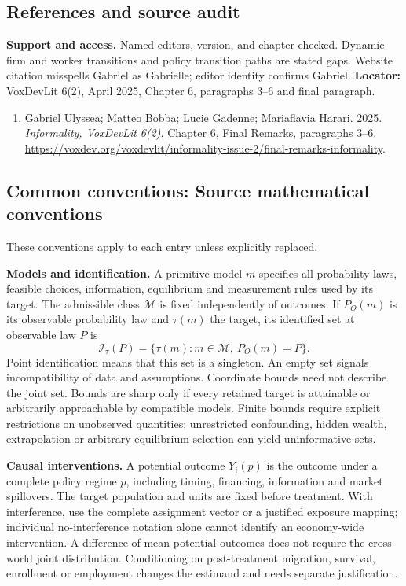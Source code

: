 \documentclass[11pt,a4paper]{article}
\begin{document}
\subsection*{References and source audit}
\textbf{Support and access.} Named editors, version, and chapter checked. Dynamic firm and worker transitions and policy transition paths are stated gaps. Website citation misspells Gabriel as Gabrielle; editor identity confirms Gabriel. \textbf{Locator:} VoxDevLit 6(2), April 2025, Chapter 6, paragraphs 3--6 and final paragraph.
\begin{enumerate}\raggedright
\item\hypertarget{definitions:source:30007658:1}{} Gabriel Ulyssea; Matteo Bobba; Lucie Gadenne; Mariaflavia Harari. 2025. \emph{Informality, VoxDevLit 6(2)}. Chapter 6, Final Remarks, paragraphs 3–6.
\url{https://voxdev.org/voxdevlit/informality-issue-2/final-remarks-informality}.
\end{enumerate}

\subsection*{Common conventions: Source mathematical conventions}

These conventions apply to each entry unless explicitly replaced.

\textbf{Models and identification.} A primitive model \(m\) specifies all probability laws, feasible choices, information, equilibrium and measurement rules used by its target. The admissible class \(\mathcal M\) is fixed independently of outcomes. If \(P_O(m)\) is its observable probability law and \(\tau(m)\) the target, its identified set at observable law \(P\) is
\[
 \mathcal I_\tau(P)=\{\tau(m):m\in\mathcal M,\ P_O(m)=P\}.
\]
Point identification means that this set is a singleton. An empty set signals incompatibility of data and assumptions. Coordinate bounds need not describe the joint set. Bounds are sharp only if every retained target is attainable or arbitrarily approachable by compatible models. Finite bounds require explicit restrictions on unobserved quantities; unrestricted confounding, hidden wealth, extrapolation or arbitrary equilibrium selection can yield uninformative sets.

\textbf{Causal interventions.} A potential outcome \(Y_i(p)\) is the outcome under a complete policy regime \(p\), including timing, financing, information and market spillovers. The target population and units are fixed before treatment. With interference, use the complete assignment vector or a justified exposure mapping; individual no-interference notation alone cannot identify an economy-wide intervention. A difference of mean potential outcomes does not require the cross-world joint distribution. Conditioning on post-treatment migration, survival, enrollment or employment changes the estimand and needs separate justification.
\end{document}
